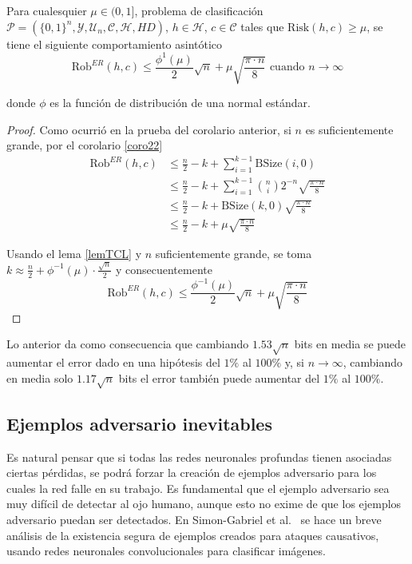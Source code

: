\begin{corolario}
Para cualesquier $\mu \in (0,1]$, problema de clasificación $\mathcal{P}=(\{0,1\}^n,\mathcal{Y},\mathcal{U}_n,\mathcal{C},\mathcal{H},HD)$, $h \in \mathcal{H}$, $c \in \mathcal{C}$ tales que $\text{Risk}(h,c)\geq \mu$, se tiene el siguiente comportamiento asintótico
$$\text{Rob}^{ER}(h,c) \leq \frac{\phi^{1}(\mu)}{2}\sqrt{n}+\mu \sqrt{\frac{\pi \cdot n}{8}} \text{    cuando } n \to \infty$$

donde $\phi$ es la función de distribución de una normal estándar.

\end{corolario}
\begin{proof}
Como ocurrió en la prueba del corolario anterior, si $n$ es suficientemente grande, por el corolario \ref{coro22}
\begin{align}
\text{Rob}^{ER}(h,c) &\leq \frac{n}{2}-k+\sum_{i=1}^{k-1} \text{BSize}(i,0) \\
&\leq \frac{n}{2}-k+\sum_{i=1}^{k-1}\binom{n}{i}2^{-n}\sqrt{\frac{\pi \cdot n}{8}} \\
&\leq \frac{n}{2}-k+\text{BSize}(k,0)\sqrt{\frac{\pi \cdot n}{8}} \\
&\leq \frac{n}{2}-k+\mu\sqrt{\frac{\pi \cdot n}{8}}
\end{align}

Usando el lema \ref{lemTCL} y $n$ suficientemente grande, se toma $k \approx \frac{n}{2}+\phi^{-1}(\mu)\cdot\frac{\sqrt{n}}{2}$ y consecuentemente
\[
\text{Rob}^{ER}(h,c)\leq \frac{\phi^{-1}(\mu)}{2}\sqrt{n} + \mu \sqrt{\frac{\pi \cdot n}{8}}
\]
\end{proof}

Lo anterior da como consecuencia que cambiando $1.53\sqrt{n}$ bits en media se puede aumentar el error dado en una hipótesis del $1\%$ al $100\%$ y, si $n \to \infty$, cambiando en media solo $1.17\sqrt{n}$ bits el error también puede aumentar del $1\%$ al $100\%$.

\subsection{Ejemplos adversario inevitables}

Es natural pensar que si todas las redes neuronales profundas tienen asociadas ciertas pérdidas, se podrá forzar la creación de ejemplos adversario para los cuales la red falle en su trabajo. Es fundamental que el ejemplo adversario sea muy difícil de detectar al ojo humano, aunque esto no exime de que los ejemplos adversario puedan ser detectados. En Simon-Gabriel et al.~\cite{UnavodibleAdvers} se hace un breve análisis de la existencia segura de ejemplos creados para ataques causativos, usando redes neuronales convolucionales para clasificar imágenes.

